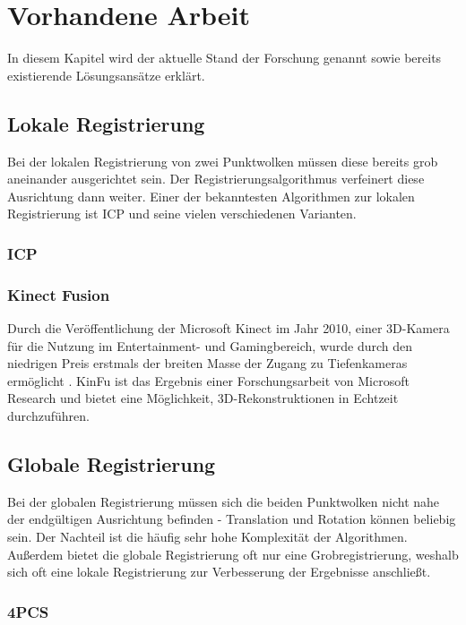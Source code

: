 
\chapter{Vorhandene Arbeit}
\label{ch:vorhandene-arbeit}

In diesem Kapitel wird der aktuelle Stand der Forschung genannt sowie bereits existierende Lösungsansätze erklärt.


\section{Lokale Registrierung}
\label{sec:local-registration}

Bei der lokalen Registrierung von zwei Punktwolken müssen diese bereits grob aneinander ausgerichtet sein.
Der Registrierungsalgorithmus verfeinert diese Ausrichtung dann weiter.
Einer der bekanntesten Algorithmen zur lokalen Registrierung ist \ac{ICP} und seine vielen verschiedenen Varianten.


\subsection{\acl{ICP}}
\label{subsec:icp}

\subsection{Kinect Fusion}
\label{subsec:kinfu}

Durch die Veröffentlichung der Microsoft Kinect im Jahr 2010, einer 3D-Kamera für die Nutzung im Entertainment- und Gamingbereich, wurde durch den niedrigen Preis erstmals der breiten Masse der Zugang zu Tiefenkameras ermöglicht \cite[1:55]{kinfuTalkYoutube}.
\ac{KinFu} ist das Ergebnis einer Forschungsarbeit von Microsoft Research \cite{izadi2011kinectfusion} und bietet eine Möglichkeit, 3D-Rekonstruktionen in Echtzeit durchzuführen.



\section{Globale Registrierung}
\label{sec:global-registration}

Bei der globalen Registrierung müssen sich die beiden Punktwolken nicht nahe der endgültigen Ausrichtung befinden - Translation und Rotation können beliebig sein.
Der Nachteil ist die häufig sehr hohe Komplexität der Algorithmen.
Außerdem bietet die globale Registrierung oft nur eine Grobregistrierung, weshalb sich oft eine lokale Registrierung zur Verbesserung der Ergebnisse anschließt.


\subsection{\acl{4PCS}}
\label{subsec:4pcs}

